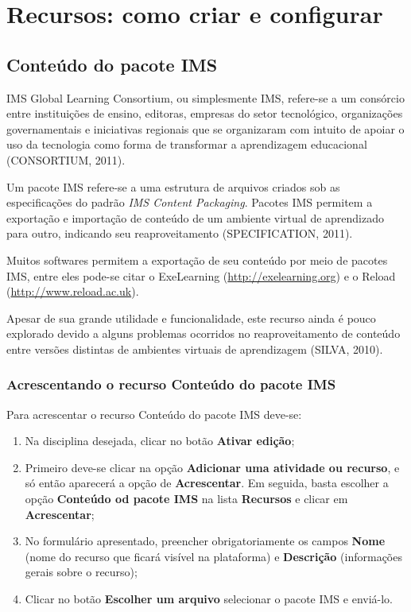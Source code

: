\chapter{Recursos: como criar e configurar}

\section{Conteúdo do pacote IMS}

IMS Global Learning Consortium, ou simplesmente IMS, refere-se a um consórcio entre instituições de ensino, editoras, empresas do setor tecnológico, organizações governamentais e iniciativas regionais que se organizaram com intuito de apoiar o uso da tecnologia como forma de transformar a aprendizagem educacional (CONSORTIUM, 2011).

Um pacote IMS refere-se a uma estrutura de arquivos criados sob as especificações do padrão \emph{IMS Content Packaging}. Pacotes IMS permitem a exportação e importação de conteúdo de um ambiente virtual de aprendizado para outro, indicando seu reaproveitamento (SPECIFICATION, 2011).

Muitos softwares permitem a exportação de seu conteúdo por meio de pacotes IMS, entre eles pode-se citar o
ExeLearning (\url{http://exelearning.org}) e o Reload (\url{http://www.reload.ac.uk}).

Apesar de sua grande utilidade e funcionalidade, este recurso ainda é pouco explorado devido a alguns problemas ocorridos no reaproveitamento de conteúdo entre versões distintas de ambientes virtuais de aprendizagem (SILVA, 2010). 

\subsection{Acrescentando o recurso Conteúdo do pacote IMS}

Para acrescentar o recurso Conteúdo do pacote IMS deve-se:
\begin{enumerate}
\item Na disciplina desejada, clicar no botão \textbf{Ativar edição};
\item Primeiro deve-se clicar na opção \textbf{Adicionar uma atividade ou recurso}, e só então aparecerá a opção de \textbf{Acrescentar}. Em seguida, basta escolher a opção \textbf{Conteúdo od pacote IMS} na lista \textbf{Recursos} e clicar em \textbf{Acrescentar};
\item No formulário apresentado, preencher obrigatoriamente os campos \textbf{Nome} (nome do recurso que ficará visível na plataforma) e \textbf{Descrição} (informações gerais sobre o recurso);
\item Clicar no botão  \textbf{Escolher um arquivo}  selecionar o pacote IMS e enviá-lo.
\end{enumerate}

